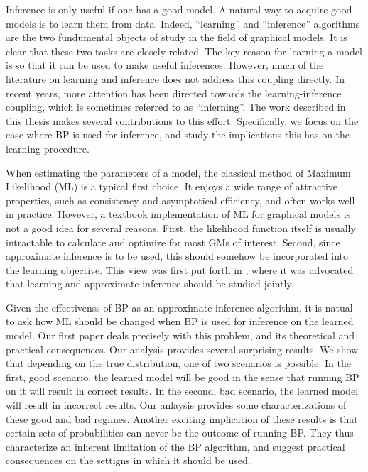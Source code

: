 Inference is only useful if one has a good model. A natural way to
acquire good models is to learn them from data. Indeed, ``learning''
and ``inference'' algorithms are the two fundumental objects of study
in the field of graphical models. It is clear that these two tasks are
closely related. The key reason for learning a model is so that it can
be used to make useful inferences. However, much of the literature on
learning and inference does not address this coupling directly. In
recent years, more attention has been directed towards the
learning-inference coupling, which is sometimes referred to as
``inferning''. The work described in this thesis makes several
contributions to this effort. Specifically, we focus on the case where BP
is used for inference, and study the implications this has on the
learning procedure.

When estimating the parameters of a model, the classical method of Maximum Likelihood (ML) is a typical first choice. It enjoys a wide range of attractive properties, such as consistency and asymptotical efficiency, and often works well in practice. However, a textbook implementation of ML for graphical models is not a good idea for several reasons. First, the likelihood function itself is usually intractable to calculate and optimize for most GMs of interest. Second, since approximate inference is to be used, this should somehow be incorporated into the learning objective. This view was first put forth in \cite{wainwright2006estimating}, where it was advocated that learning and approximate inference should be studied jointly.  
 
Given the effectivenss of BP as an approximate inference algorithm, it is natual to ask how ML should be changed when BP is used for inference on the learned model. Our first paper \cite{heinemann2012cannot} deals precisely with this problem, and its theoretical and practical consequences. Our analysis provides several surprising results. We show that depending on the true distribution, one of two scenarios is possible. In the first, good scenario, the learned model will be good in the sense that running BP on it will result in correct results. In the second, bad scenario, the learned model will result in incorrect results. Our anlaysis provides some characterizations of these good and bad regimes. Another exciting implication of these results is that certain sets of probabilities can never be the outcome of running BP. They thus characterize an inherent limitation of the BP algorithm, and suggest practical consequences on the settigns in which it should be used.  

